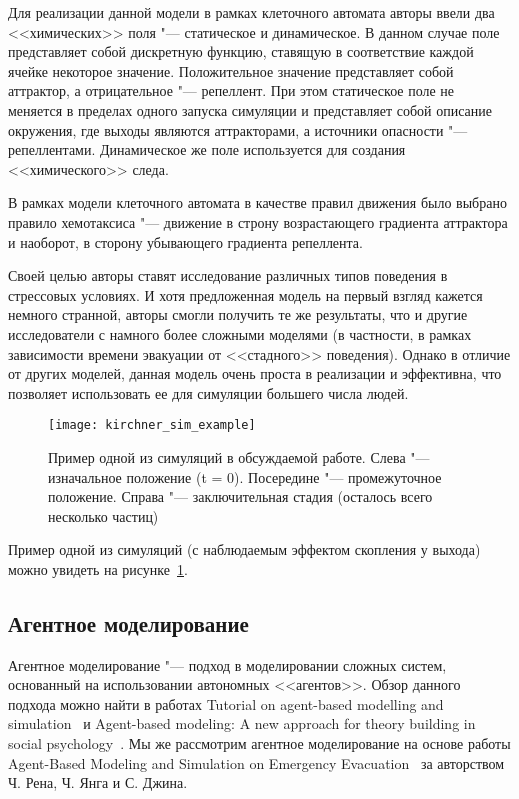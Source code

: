 Для реализации данной модели в рамках клеточного автомата авторы ввели два <<химических>> поля "--- статическое и динамическое.
В данном случае поле представляет собой дискретную функцию, ставящую в соответствие каждой ячейке некоторое значение.
Положительное значение представляет собой аттрактор, а отрицательное "--- репеллент.
При этом статическое поле не меняется в пределах одного запуска симуляции и представляет собой описание окружения,
где выходы являются аттракторами, а источники опасности "--- репеллентами.
Динамическое же поле используется для создания <<химического>> следа.

В рамках модели клеточного автомата в качестве правил движения было выбрано правило хемотаксиса "---
движение в строну возрастающего градиента аттрактора и наоборот, в сторону убывающего градиента репеллента.

Своей целью авторы ставят исследование различных типов поведения в стрессовых условиях.
И хотя предложенная модель на первый взгляд кажется немного странной, авторы смогли получить те же результаты,
что и другие исследователи с намного более сложными моделями (в частности, в рамках зависимости времени эвакуации от <<стадного>> поведения).
Однако в отличие от других моделей, данная модель очень проста в реализации и эффективна, что позволяет использовать ее для симуляции большего числа людей.

\begin{figure}[ht!]
  \centering
  \texttt{[image: kirchner\_sim\_example]}
  \caption{Пример одной из симуляций в обсуждаемой работе. Слева "--- изначальное положение (t = 0). Посередине "--- промежуточное положение. Справа "--- заключительная стадия (осталось всего несколько частиц)}
  \label{sub:overview:kirchner:sim_example}
\end{figure}

Пример одной из симуляций (с наблюдаемым эффектом скопления у выхода) можно увидеть на рисунке~\ref{sub:overview:kirchner:sim_example}.

\subsection{Агентное моделирование}
\label{sub:overview:agent}

Агентное моделирование "--- подход в моделировании сложных систем, основанный на использовании автономных <<агентов>>. Обзор данного подхода можно найти в работах
Tutorial on agent-based modelling and simulation~\cite{macal2010tutorial} и Agent-based modeling: A new approach for theory building in social psychology~\cite{smith2007agent}.
Мы же рассмотрим агентное моделирование на основе работы Agent-Based Modeling and Simulation on Emergency Evacuation~\cite{ren2009agent} за авторством Ч. Рена, Ч. Янга и С. Джина.

